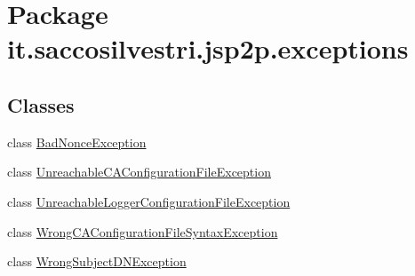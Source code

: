\hypertarget{namespaceit_1_1saccosilvestri_1_1jsp2p_1_1exceptions}{
\section{\-Package it.saccosilvestri.jsp2p.exceptions}
\label{namespaceit_1_1saccosilvestri_1_1jsp2p_1_1exceptions}
}
\subsection*{\-Classes}
\begin{DoxyCompactItemize}
\item 
class \hyperlink{classit_1_1saccosilvestri_1_1jsp2p_1_1exceptions_1_1_bad_nonce_exception}{\-Bad\-Nonce\-Exception}
\item 
class \hyperlink{classit_1_1saccosilvestri_1_1jsp2p_1_1exceptions_1_1_unreachable_c_a_configuration_file_exception}{\-Unreachable\-C\-A\-Configuration\-File\-Exception}
\item 
class \hyperlink{classit_1_1saccosilvestri_1_1jsp2p_1_1exceptions_1_1_unreachable_logger_configuration_file_exception}{\-Unreachable\-Logger\-Configuration\-File\-Exception}
\item 
class \hyperlink{classit_1_1saccosilvestri_1_1jsp2p_1_1exceptions_1_1_wrong_c_a_configuration_file_syntax_exception}{\-Wrong\-C\-A\-Configuration\-File\-Syntax\-Exception}
\item 
class \hyperlink{classit_1_1saccosilvestri_1_1jsp2p_1_1exceptions_1_1_wrong_subject_d_n_exception}{\-Wrong\-Subject\-D\-N\-Exception}
\end{DoxyCompactItemize}
